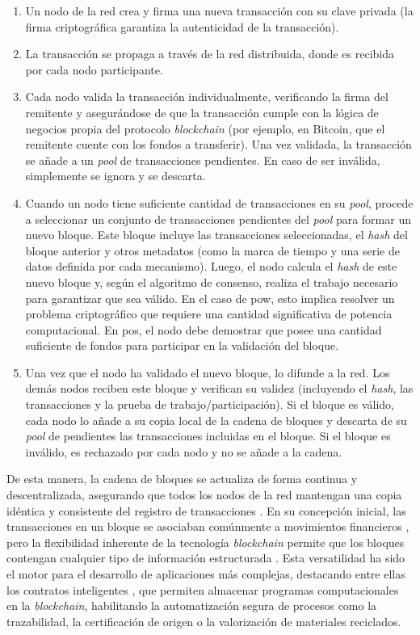 \begin{enumerate}
    \item Un \gls{nodo} de la red crea y firma una nueva transacción con su clave privada (la firma criptográfica garantiza la autenticidad de la transacción).
    \item La transacción se propaga a través de la red distribuida, donde es recibida por cada nodo participante.
    \item Cada nodo valida la transacción individualmente, verificando la firma del remitente y asegurándose de que la transacción cumple con la lógica de negocios propia del protocolo \textit{blockchain} (por ejemplo, en Bitcoin, que el remitente cuente con los fondos a transferir). Una vez validada, la transacción se añade a un \textit{pool} de transacciones pendientes. En caso de ser inválida, simplemente se ignora y se descarta. 
    \item Cuando un nodo tiene suficiente cantidad de transacciones en su \textit{pool}, procede a seleccionar un conjunto de transacciones pendientes del \textit{pool} para formar un nuevo bloque. Este bloque incluye las transacciones seleccionadas, el \textit{hash} del bloque anterior y otros metadatos (como la marca de tiempo y una serie de datos definida por cada mecanismo). Luego, el nodo calcula el \textit{hash} de este nuevo bloque y, según el algoritmo de consenso, realiza el trabajo necesario para garantizar que sea válido. En el caso de \acrshort{pow}, esto implica resolver un problema criptográfico que requiere una cantidad significativa de potencia computacional. En \acrshort{pos}, el nodo debe demostrar que posee una cantidad suficiente de fondos para participar en la validación del bloque.
    \item Una vez que el nodo ha validado el nuevo bloque, lo difunde a la red. Los demás nodos reciben este bloque y verifican su validez (incluyendo el \textit{hash}, las transacciones y la prueba de trabajo/participación). Si el bloque es válido, cada nodo lo añade a su copia local de la cadena de bloques y descarta de su \textit{pool} de pendientes las transacciones incluidas en el bloque. Si el bloque es inválido, es rechazado por cada nodo y no se añade a la cadena.
\end{enumerate}

De esta manera, la cadena de bloques se actualiza de forma continua y descentralizada, asegurando que todos los nodos de la red mantengan una copia idéntica y consistente del registro de transacciones \cite{bartolomeo2020introduccion}. En su concepción inicial, las transacciones en un bloque se asociaban comúnmente a movimientos financieros \cite{satoshi2008bitcoin}, pero la flexibilidad inherente de la tecnología \textit{blockchain} permite que los bloques contengan cualquier tipo de información estructurada \cite{bartolomeo2020introduccion}. Esta versatilidad ha sido el motor para el desarrollo de aplicaciones más complejas, destacando entre ellas los contratos inteligentes \cite{sunny2022systematic}, que permiten almacenar programas computacionales en la \textit{blockchain}, habilitando la automatización segura de procesos como la trazabilidad, la certificación de origen o la valorización de materiales reciclados.

